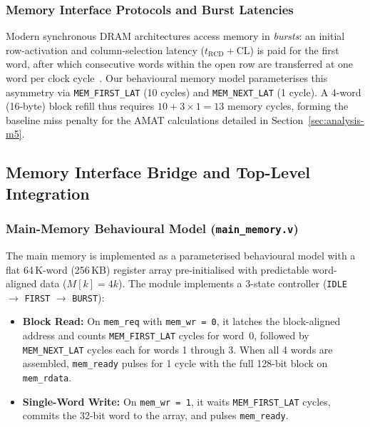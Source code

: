 \subsubsection{Memory Interface Protocols and Burst Latencies}
Modern synchronous DRAM architectures access memory in \emph{bursts}: an
initial row-activation and column-selection latency ($t_{\mathrm{RCD}} + \text{CL}$)
is paid for the first word, after which consecutive words within the open row
are transferred at one word per clock cycle~\cite{hennessy2017}. Our behavioural
memory model parameterises this asymmetry via \texttt{MEM\_FIRST\_LAT} (10 cycles)
and \texttt{MEM\_NEXT\_LAT} (1 cycle). A 4-word (16-byte) block refill thus requires
$10 + 3 \times 1 = 13$ memory cycles, forming the baseline miss penalty for the
AMAT calculations detailed in Section~\ref{sec:analysis-m5}.


\subsection{Memory Interface Bridge and Top-Level Integration}
\label{sec:proposed-m3}

\subsubsection{Main-Memory Behavioural Model (\texttt{main\_memory.v})}
The main memory is implemented as a parameterised behavioural model with a
flat 64\,K-word (256\,KB) register array pre-initialised with predictable
word-aligned data ($M[k] = 4k$). The module implements a 3-state controller
(\texttt{IDLE} $\to$ \texttt{FIRST} $\to$ \texttt{BURST}):
\begin{itemize}
    \item \textbf{Block Read:} On \texttt{mem\_req} with \texttt{mem\_wr = 0},
        it latches the block-aligned address and counts \texttt{MEM\_FIRST\_LAT}
        cycles for word~0, followed by \texttt{MEM\_NEXT\_LAT} cycles each for
        words 1 through 3. When all 4 words are assembled, \texttt{mem_ready}
        pulses for 1 cycle with the full 128-bit block on \texttt{mem\_rdata}.
    \item \textbf{Single-Word Write:} On \texttt{mem\_wr = 1}, it waits
        \texttt{MEM\_FIRST\_LAT} cycles, commits the 32-bit word to the array,
        and pulses \texttt{mem\_ready}.
\end{itemize}

